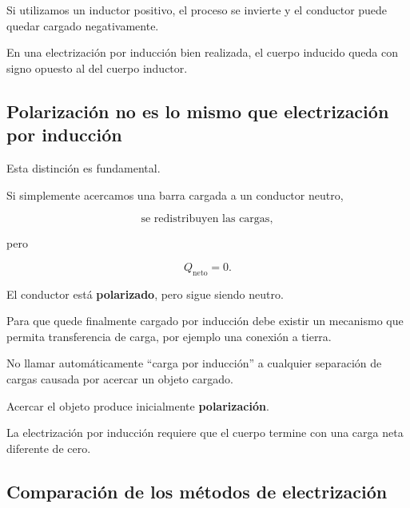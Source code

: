 Si utilizamos un inductor positivo, el proceso se invierte y el conductor
puede quedar cargado negativamente.

\begin{idea}
En una electrización por inducción bien realizada, el cuerpo inducido queda
con signo opuesto al del cuerpo inductor.
\end{idea}



\subsection{Polarización no es lo mismo que electrización por inducción}

Esta distinción es fundamental.

Si simplemente acercamos una barra cargada a un conductor neutro,

\[
\text{se redistribuyen las cargas},
\]

pero

\[
Q_{\text{neto}}=0.
\]

El conductor está \textbf{polarizado}, pero sigue siendo neutro.

Para que quede finalmente cargado por inducción debe existir un mecanismo
que permita transferencia de carga, por ejemplo una conexión a tierra.

\begin{errorfrecuente}
No llamar automáticamente ``carga por inducción'' a cualquier separación de
cargas causada por acercar un objeto cargado.

Acercar el objeto produce inicialmente
\textbf{polarización}.

La electrización por inducción requiere que el cuerpo termine con una carga
neta diferente de cero.
\end{errorfrecuente}



\subsection{Comparación de los métodos de electrización}

